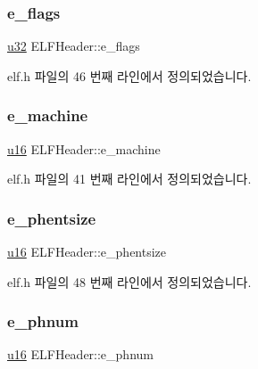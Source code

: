 \subsubsection{\texorpdfstring{e\+\_\+flags}{e\_flags}}
{\footnotesize\ttfamily \mbox{\hyperlink{_system_8h_a10e94b422ef0c20dcdec20d31a1f5049}{u32}} E\+L\+F\+Header\+::e\+\_\+flags}



elf.\+h 파일의 46 번째 라인에서 정의되었습니다.

\mbox{\label{struct_e_l_f_header_a15a148d4a49f9e5993698c2096e8c9bd}} 
\subsubsection{\texorpdfstring{e\+\_\+machine}{e\_machine}}
{\footnotesize\ttfamily \mbox{\hyperlink{_system_8h_a9e6c91d77e24643b888dbd1a1a590054}{u16}} E\+L\+F\+Header\+::e\+\_\+machine}



elf.\+h 파일의 41 번째 라인에서 정의되었습니다.

\mbox{\label{struct_e_l_f_header_a54f6348c72b743df1298f14d9727ee63}} 
\subsubsection{\texorpdfstring{e\+\_\+phentsize}{e\_phentsize}}
{\footnotesize\ttfamily \mbox{\hyperlink{_system_8h_a9e6c91d77e24643b888dbd1a1a590054}{u16}} E\+L\+F\+Header\+::e\+\_\+phentsize}



elf.\+h 파일의 48 번째 라인에서 정의되었습니다.

\mbox{\label{struct_e_l_f_header_a40ea098754df174746d084dd4ac1322d}} 
\subsubsection{\texorpdfstring{e\+\_\+phnum}{e\_phnum}}
{\footnotesize\ttfamily \mbox{\hyperlink{_system_8h_a9e6c91d77e24643b888dbd1a1a590054}{u16}} E\+L\+F\+Header\+::e\+\_\+phnum}



